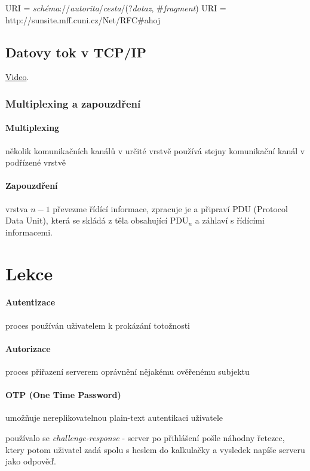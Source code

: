 \documentclass[10pt,a4paper]{article}
\begin{document}
URI = \textit{schéma}://\textit{autorita}/\textit{cesta}/(?\textit{dotaz}, \#\textit{fragment})
URI = http://sunsite.mff.cuni.cz/Net/RFC\#ahoj

\subsection{Datovy tok v TCP/IP}

\href{https://youtu.be/uwoD5YsGACg}{Video}.

\subsubsection{Multiplexing a zapouzdření}

\paragraph{Multiplexing} několik komunikačních kanálů v určité vrstvě používá stejny komunikační kanál v podřízené vrstvě

\paragraph{Zapouzdření} vrstva $n-1$ převezme řídící informace, zpracuje je a připraví PDU (Protocol Data Unit), která se skládá z těla obsahující PDU$_n$ a záhlaví s řídícími informacemi.

\newpage

\section{Lekce}

\paragraph{Autentizace} proces používán uživatelem k prokázání totožnosti

\paragraph{Autorizace} proces přiřazení serverem oprávnění nějakému ověřenému subjektu

\paragraph{OTP (One Time Password)} umožňuje nereplikovatelnou plain-text autentikaci uživatele

používalo se \textit{challenge-response} - server po přihlášení pošle náhodny řetezec, ktery potom uživatel zadá spolu s heslem do kalkulačky a vysledek napíše serveru jako odpověď.
\end{document}
